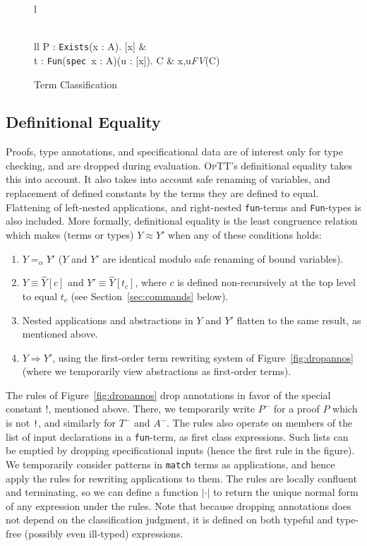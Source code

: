 \documentclass[9pt,natbib]{sigplanconf}
\newcommand{\seq}[3]{#1 \vdash #2 : #3}
\newcommand{\optt}{\textsc{OpTT}}
\newcommand{\bang}[0]{\texttt{!}}
\newcommand{\To}{\Rightarrow}
\begin{document}
\begin{figure}
\begin{tabular}{l}
\\
\\

\infer{\seq{\Gamma}{\texttt{existse\_term}\ P\ t}{C}}
{\begin{array}{ll}
\seq{\Gamma}{P}{\texttt{Exists}(x : A). [x]} &\ \\
\seq{\Gamma}{t}{\texttt{Fun}(\texttt{spec}\ x : A)(u : \hat{F}[x]). C & x,u\not\in\textit{FV}(C)}
\end{array}}

\end{tabular}
\caption{\label{fig:cl-term}Term Classification}
\end{figure}

\subsection{Definitional Equality}
\label{sec:defeq}

Proofs, type annotations, and specificational data are of interest
only for type checking, and are dropped during evaluation.  \optt's
definitional equality takes this into account.  It also takes into
account safe renaming of variables, and replacement of defined
constants by the terms they are defined to equal.  Flattening of
left-nested applications, and right-nested \texttt{fun}-terms and
\texttt{Fun}-types is also included.  More formally, definitional
equality is the least congruence relation which makes (terms or types)
$Y \approx Y'$ when any of these conditions holds:
\begin{enumerate}
\item $Y =_\alpha Y'$ ($Y$ and $Y'$ are identical modulo safe renaming
of bound variables).
\item $Y \equiv \hat{Y}[c]$ and $Y' \equiv \hat{Y}[t_c]$, where $c$ is
defined non-recursively at the top level to equal $t_c$ (see
Section~\ref{sec:commands} below).
\item Nested applications and abstractions in $Y$ and $Y'$ flatten
to the same result, as mentioned above.
\item $Y \To Y'$, using the first-order term rewriting system of
Figure~\ref{fig:dropannos} (where we temporarily view abstractions
as first-order terms).  
\end{enumerate}

\noindent The rules of Figure~\ref{fig:dropannos} drop annotations in
favor of the special constant $\bang$, mentioned above.  There, we
temporarily write $P^-$ for a proof $P$ which is not \bang, and
similarly for $T^-$ and $A^-$.  The rules also operate on members of
the list of input declarations in a \texttt{fun}-term, as first class
expressions.  Such lists can be emptied by dropping specificational
inputs (hence the first rule in the figure).  We temporarily consider
patterns in \texttt{match} terms as applications, and hence apply the
rules for rewriting applications to them.  The rules are locally
confluent and terminating, so we can define a function $|\cdot|$ to
return the unique normal form of any expression under the rules.  Note
that because dropping annotations does not depend on the
classification judgment, it is defined on both typeful and type-free
(possibly even ill-typed) expressions.
\end{document}
